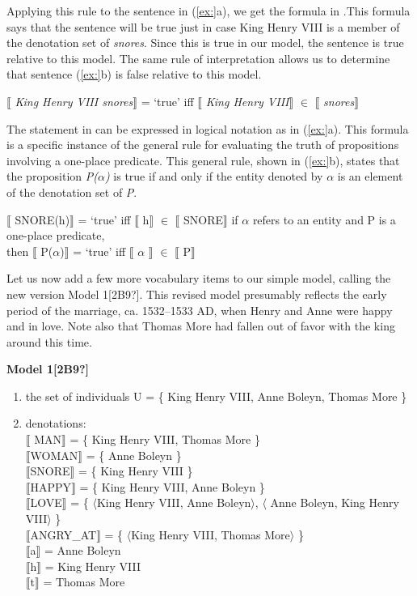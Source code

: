 Applying this rule to the sentence in (\ref{ex:}a), we get the formula in .This formula says that the sentence will be true just in case King Henry VIII is a member of the denotation set of \textit{snores}. Since this is true in our model, the sentence is true relative to this model. The same rule of interpretation allows us to determine that sentence (\ref{ex:}b) is false relative to this model.


\ea
{}$\llbracket$ \textit{King Henry VIII snores}$\rrbracket$  = ‘true’  iff  $\llbracket$ \textit{King Henry VIII}$\rrbracket$  ${\in}$ $\llbracket$ \textit{snores}$\rrbracket$ 
\z


The statement in  can be expressed in logical notation as in (\ref{ex:}a). This formula is a specific instance of the general rule for evaluating the truth of propositions involving a one-place predicate. This general rule, shown in (\ref{ex:}b), states that the proposition \textit{P($\alpha $)} is true if and only if the entity denoted by \textit{$\alpha $} is an element of the denotation set of \textit{P}.


\ea
\ea  $\llbracket$ SNORE(h)$\rrbracket$  = ‘true’  iff  $\llbracket$ h$\rrbracket$  ${\in}$ $\llbracket$ SNORE$\rrbracket$ 
\ex  if $\alpha $ refers to an entity and P is a one-place predicate,\\
  then  $\llbracket$ P($\alpha $)$\rrbracket$  = ‘true’  iff  $\llbracket$ $\alpha $ $\rrbracket$  ${\in}$ $\llbracket$ P$\rrbracket$ 
\z \z


Let us now add a few more vocabulary items to our simple model, calling the new version Model 1[2B9?]. This revised model presumably reflects the early period of the marriage, ca. 1532–1533 AD, when Henry and Anne were happy and in love. Note also that Thomas More had fallen out of favor with the king around this time.


\textbf{Model 1[2B9?]}

\begin{enumerate}
\item the set of individuals U = \{ King Henry VIII, Anne Boleyn, Thomas More \}
\item denotations\textsc{:\\
{}$\llbracket$ }\textsc{MAN}$\rrbracket$  = \{ King Henry VIII, Thomas More \}\\
\textsc{$\llbracket$}WOMAN$\rrbracket$  = \{ Anne Boleyn \}\\
\textsc{$\llbracket$}SNORE$\rrbracket$  = \{ King Henry VIII \}\\
\textsc{$\llbracket$}HAPPY$\rrbracket$  = \{ King Henry VIII, Anne Boleyn \}\\
\textsc{$\llbracket$}LOVE$\rrbracket$  = \{ $\langle$King Henry VIII, Anne Boleyn$\rangle$, $\langle$ Anne Boleyn, King Henry VIII$\rangle$ \}\\
\textsc{$\llbracket$}ANGRY\_AT$\rrbracket$  = \{ $\langle$King Henry VIII, Thomas More$\rangle$ \}\\
\textsc{$\llbracket$}a$\rrbracket$  = Anne Boleyn\\
\textsc{$\llbracket$}h$\rrbracket$  = King Henry VIII\\
\textsc{$\llbracket$}t$\rrbracket$  = Thomas More
\end{enumerate}

